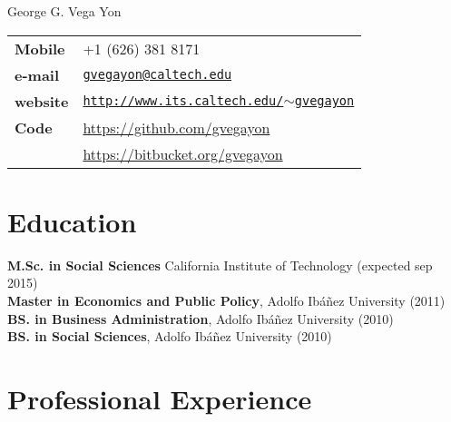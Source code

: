 \documentclass[letterpaper, 11pt]{article}
\def\name{George G. Vega Yon}
\renewenvironment{itemize}{
  \begin{list}{}{
    \setlength{\leftmargin}{0.45cm}
  }
}{
  \end{list}
}
\begin{document}
{\huge \name}


\vspace{0.25in}

\begin{minipage}{0.45\linewidth}
  \begin{tabular}{>{\bfseries}p{4cm}l}
    Mobile & +1 (626) 381 8171 \\
    e-mail & \href{mailto:gvegayon@caltech.edu}{\tt gvegayon@caltech.edu} \\
    website & \href{http://www.its.caltech.edu/~gvegayon}{\tt http://www.its.caltech.edu/$\sim$gvegayon} \\
    Code & \href{https://github.com/gvegayon}{https://github.com/gvegayon}\\
    & \href{https://bitbucket.org/gvegayon}{https://bitbucket.org/gvegayon}
  \end{tabular}
\end{minipage}

\section*{Education}

\begin{itemize}
\item {\bf M.Sc. in Social Sciences} California Institute of Technology (expected sep 2015) \\
{\bf Master in Economics and Public Policy}, Adolfo Ib\'a\~nez University (2011) \\
{\bf BS. in Business Administration}, Adolfo Ib\'a\~nez University (2010) \\
{\bf BS. in Social Sciences}, Adolfo Ib\'a\~nez University (2010)
\end{itemize}

\section*{Professional Experience}
\end{document}
